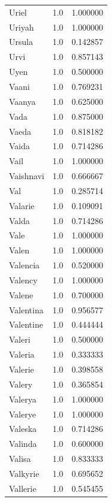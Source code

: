 \documentclass[
  letterpaper,
  DIV=11,
  numbers=noendperiod]{scrreprt}
\begin{document}
\begin{tabular}{lrr}
Uriel           &   1.0 &   1.000000 \\
Uriyah          &   1.0 &   1.000000 \\
Ursula          &   1.0 &   0.142857 \\
Urvi            &   1.0 &   0.857143 \\
Uyen            &   1.0 &   0.500000 \\
Vaani           &   1.0 &   0.769231 \\
Vaanya          &   1.0 &   0.625000 \\
Vada            &   1.0 &   0.875000 \\
Vaeda           &   1.0 &   0.818182 \\
Vaida           &   1.0 &   0.714286 \\
Vail            &   1.0 &   1.000000 \\
Vaishnavi       &   1.0 &   0.666667 \\
Val             &   1.0 &   0.285714 \\
Valarie         &   1.0 &   0.109091 \\
Valda           &   1.0 &   0.714286 \\
Vale            &   1.0 &   1.000000 \\
Valen           &   1.0 &   1.000000 \\
Valencia        &   1.0 &   0.520000 \\
Valency         &   1.0 &   1.000000 \\
Valene          &   1.0 &   0.700000 \\
Valentina       &   1.0 &   0.956577 \\
Valentine       &   1.0 &   0.444444 \\
Valeri          &   1.0 &   0.500000 \\
Valeria         &   1.0 &   0.333333 \\
Valerie         &   1.0 &   0.398558 \\
Valery          &   1.0 &   0.365854 \\
Valerya         &   1.0 &   1.000000 \\
Valerye         &   1.0 &   1.000000 \\
Valeska         &   1.0 &   0.714286 \\
Valinda         &   1.0 &   0.600000 \\
Valisa          &   1.0 &   0.833333 \\
Valkyrie        &   1.0 &   0.695652 \\
Vallerie        &   1.0 &   0.545455 \\

\end{tabular}
\end{document}

